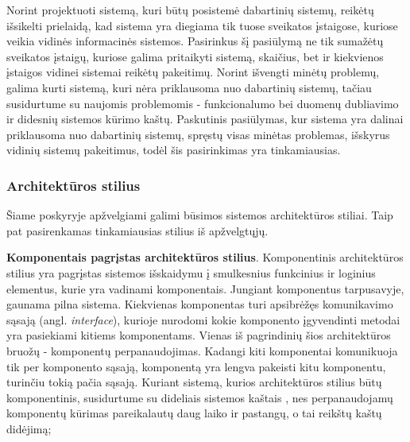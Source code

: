 Norint projektuoti sistemą, kuri būtų posistemė dabartinių sistemų, reikėtų išsikelti prielaidą, kad sistema yra diegiama tik tuose sveikatos įstaigose, kuriose veikia vidinės informacinės sistemos. Pasirinkus šį pasiūlymą ne tik sumažėtų sveikatos įstaigų, kuriose galima pritaikyti sistemą, skaičius, bet ir kiekvienos įstaigos vidinei sistemai reikėtų pakeitimų. Norint išvengti minėtų problemų, galima kurti sistemą, kuri nėra priklausoma nuo dabartinių sistemų, tačiau susidurtume su naujomis problemomis - funkcionalumo bei duomenų dubliavimo ir didesnių sistemos kūrimo kaštų. Paskutinis pasiūlymas, kur sistema yra dalinai priklausoma nuo dabartinių sistemų, spręstų visas minėtas problemas, išskyrus vidinių sistemų pakeitimus, todėl šis pasirinkimas yra tinkamiausias.


\subsubsection{Architektūros stilius}
Šiame poskyryje apžvelgiami galimi būsimos sistemos architektūros stiliai. Taip pat pasirenkamas tinkamiausias stilius iš apžvelgtųjų. 

\textbf{Komponentais pagrįstas architektūros stilius}. Komponentinis architektūros stilius yra pagrįstas sistemos išskaidymu į smulkesnius funkcinius ir loginius elementus, kurie yra vadinami komponentais. Jungiant komponentus tarpusavyje, gaunama pilna sistema. Kiekvienas komponentas turi apsibrėžęs komunikavimo sąsają (angl. \textit{interface}), kurioje nurodomi kokie komponento įgyvendinti metodai yra pasiekiami kitiems komponentams. Vienas iš pagrindinių šios architektūros bruožų - komponentų perpanaudojimas. Kadangi kiti komponentai komunikuoja tik per komponento sąsają, komponentą yra lengva pakeisti kitu komponentu, turinčiu tokią pačia sąsają. Kuriant sistemą, kurios architektūros stilius būtų komponentinis, susidurtume su dideliais sistemos kaštais \cite{Component}, nes perpanaudojamų komponentų kūrimas pareikalautų daug laiko ir pastangų, o tai reikštų kaštų didėjimą;


